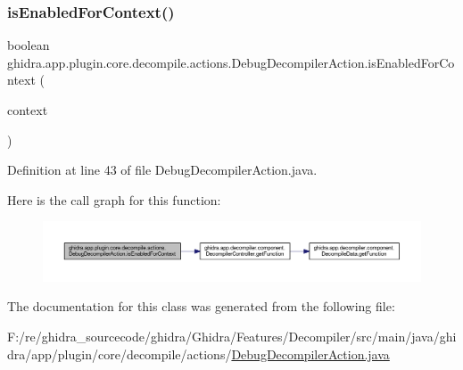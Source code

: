 \subsubsection{\texorpdfstring{isEnabledForContext()}{isEnabledForContext()}}
{\footnotesize\ttfamily boolean ghidra.\+app.\+plugin.\+core.\+decompile.\+actions.\+Debug\+Decompiler\+Action.\+is\+Enabled\+For\+Context (\begin{DoxyParamCaption}\item[{Action\+Context}]{context }\end{DoxyParamCaption})\hspace{0.3cm}{\ttfamily [inline]}}



Definition at line 43 of file Debug\+Decompiler\+Action.\+java.

Here is the call graph for this function\+:
\nopagebreak
\begin{figure}[H]
\begin{center}
\leavevmode
\includegraphics[width=350pt]{classghidra_1_1app_1_1plugin_1_1core_1_1decompile_1_1actions_1_1_debug_decompiler_action_a8e8216c53c6efcbf986da57796f50314_cgraph}
\end{center}
\end{figure}


The documentation for this class was generated from the following file\+:\begin{DoxyCompactItemize}
\item 
F\+:/re/ghidra\+\_\+sourcecode/ghidra/\+Ghidra/\+Features/\+Decompiler/src/main/java/ghidra/app/plugin/core/decompile/actions/\mbox{\hyperlink{_debug_decompiler_action_8java}{Debug\+Decompiler\+Action.\+java}}\end{DoxyCompactItemize}
